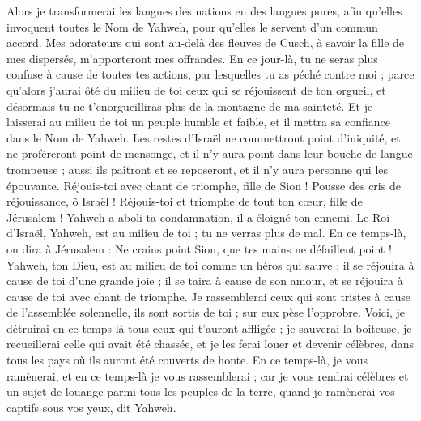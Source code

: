 \begin{multicols}{2}
Alors je transformerai les langues des nations en des langues pures, afin qu’elles invoquent toutes le Nom de Yahweh, pour qu’elles le servent d'un commun accord.
Mes adorateurs qui sont au-delà des fleuves de Cusch, à savoir la fille de mes dispersés, m'apporteront mes offrandes.
En ce jour-là, tu ne seras plus confuse à cause de toutes tes actions, par lesquelles tu as péché contre moi ; parce qu'alors j'aurai ôté du milieu de toi ceux qui se réjouissent de ton orgueil, et désormais tu ne t'enorgueilliras plus de la montagne de ma sainteté.
Et je laisserai au milieu de toi un peuple humble et faible, et il mettra sa confiance dans le Nom de Yahweh.
Les restes d'Israël ne commettront point d'iniquité, et ne proféreront point de mensonge, et il n'y aura point dans leur bouche de langue trompeuse ; aussi ils paîtront et se reposeront, et il n'y aura personne qui les épouvante.
Réjouis-toi avec chant de triomphe, fille de Sion ! Pousse des cris de réjouissance, ô Israël ! Réjouis-toi et triomphe de tout ton cœur, fille de Jérusalem !
Yahweh a aboli ta condamnation, il a éloigné ton ennemi. Le Roi d'Israël, Yahweh, est au milieu de toi ; tu ne verras plus de mal.
En ce temps-là, on dira à Jérusalem : Ne crains point Sion, que tes mains ne défaillent point !
Yahweh, ton Dieu, est au milieu de toi comme un héros qui sauve ; il se réjouira à cause de toi d'une grande joie ; il se taira à cause de son amour, et se réjouira à cause de toi avec chant de triomphe.
Je rassemblerai ceux qui sont tristes à cause de l'assemblée solennelle, ils sont sortis de toi ; sur eux pèse l’opprobre.
Voici, je détruirai en ce temps-là tous ceux qui t'auront affligée ; je sauverai la boiteuse, je recueillerai celle qui avait été chassée, et je les ferai louer et devenir célèbres, dans tous les pays où ils auront été couverts de honte.
En ce temps-là, je vous ramènerai, et en ce temps-là je vous rassemblerai ; car je vous rendrai célèbres et un sujet de louange parmi tous les peuples de la terre, quand je ramènerai vos captifs sous vos yeux, dit Yahweh.
\PPE{}
\end{multicols}
